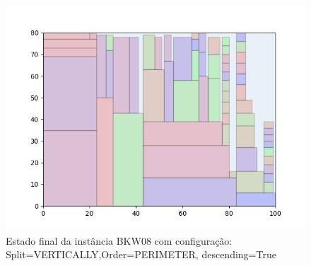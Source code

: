 \begin{figure}[H]
    \centering
    \caption[]{Estado final da instância BKW08 com configuração: Split=VERTICALLY,Order=PERIMETER, descending=True}
    \label{fig:bkw08-vertically-perimeter-true}
    \includegraphics[scale=0.5]{output/figures/bkw/bkw08/vertically/perimeter/true/00}
\end{figure}